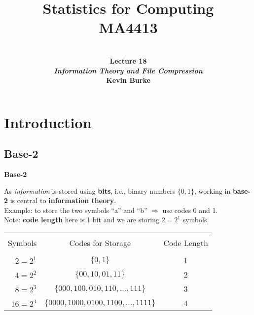 \documentclass[compress]{beamer}        %
\title{{\huge Statistics for Computing\\[0.1cm]MA4413}}
\author[Kevin Burke]{{\bf\\[0.5cm]{\huge Lecture 18}\\[0.2cm]\emph{Information Theory and File Compression}\\[1.4cm]Kevin Burke}\\[0.3cm]\tcb{kevin.burke@ul.ie}}
\institute[University of Limerick, Maths \& Stats Dept]{}
\date{}
\makeatletter
\newcommand{\tcb}{\textcolor{beamer@blendedblue}}
\makeatother
\begin{document}
\begin{frame}[t]
\titlepage
\end{frame}


\section{Introduction}
\subsection{Base-2}
\begin{frame}{\bf \tcb{Base-2}}

As \emph{information} is stored using {\bf bits}, i.e., binary numbers $\{0,1\}$, working in {\bf base-2} is central to {\bf information theory}.\\[0.2cm]

Example: to store the two symbols ``a'' and ``b'' $\Rightarrow$ use codes 0 and 1.\\[0.2cm]
Note: {\bf code length} here is 1 bit and we are storing $2 = 2^1$ symbols.


\begin{center}
\begin{tabular}{|rcc|}
\hline
&&\\[-0.4cm]
Symbols & Codes for Storage & Code Length \\[0.1cm]
\hline
&&\\[-0.4cm]
$2 = 2^1$ & $\{0, 1\}$  & 1 \\[0.3cm]
$4 = 2^2$ & $\{00, 10, 01, 11\}$  & 2 \\[0.3cm]
$8 = 2^3$ & $\{000, 100, 010, 110, \ldots, 111\}$  & 3 \\[0.3cm]
$16 = 2^4$ & $\{0000, 1000, 0100, 1100, \ldots, 1111\}$  & 4 \\[0.1cm]
\hline
\end{tabular}
\end{center}

\end{frame}
\end{document}
